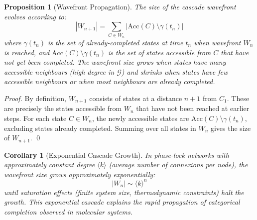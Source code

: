 \documentclass[12pt,a4paper]{article}
\newtheorem{proposition}[theorem]{Proposition}
\newtheorem{corollary}[theorem]{Corollary}
\theoremstyle{definition}
\theoremstyle{remark}
\newcommand{\phaselockgraph}{\mathcal{G}}
\newcommand{\accessible}{\text{Acc}}
\begin{document}
\begin{proposition}[Wavefront Propagation]
\label{prop:wavefront_propagation}
The size of the cascade wavefront evolves according to:
\begin{equation}
|W_{n+1}| = \sum_{C \in W_n} |\accessible(C) \setminus \gamma(t_n)|
\end{equation}
where $\gamma(t_n)$ is the set of already-completed states at time $t_n$ when wavefront $W_n$ is reached, and $\accessible(C) \setminus \gamma(t_n)$ is the set of states accessible from $C$ that have not yet been completed. The wavefront size grows when states have many accessible neighbours (high degree in $\phaselockgraph$) and shrinks when states have few accessible neighbours or when most neighbours are already completed.
\end{proposition}

\begin{proof}
By definition, $W_{n+1}$ consists of states at a distance $n+1$ from $C_1$. These are precisely the states accessible from $W_n$ that have not been reached at earlier steps. For each state $C \in W_n$, the newly accessible states are $\accessible(C) \setminus \gamma(t_n)$, excluding states already completed. Summing over all states in $W_n$ gives the size of $W_{n+1}$. \qed
\end{proof}

\begin{corollary}[Exponential Cascade Growth]
\label{cor:exponential_cascade}
In phase-lock networks with approximately constant degree $\langle k \rangle$ (average number of connexions per node), the wavefront size grows approximately exponentially:
\begin{equation}
|W_n| \sim \langle k \rangle^n
\end{equation}
until saturation effects (finite system size, thermodynamic constraints) halt the growth. This exponential cascade explains the rapid propagation of categorical completion observed in molecular systems.
\end{corollary}
\end{document}
